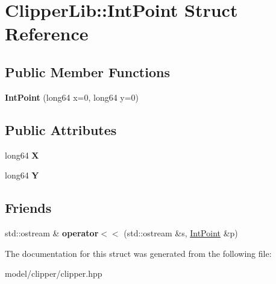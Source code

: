 \hypertarget{structClipperLib_1_1IntPoint}{\section{Clipper\-Lib\-:\-:Int\-Point Struct Reference}
\label{structClipperLib_1_1IntPoint}
}
\subsection*{Public Member Functions}
\begin{DoxyCompactItemize}
\item 
\hypertarget{structClipperLib_1_1IntPoint_a455b8d5c7f6d4c8e5adebcac8fa11e71}{{\bfseries Int\-Point} (long64 x=0, long64 y=0)}\label{structClipperLib_1_1IntPoint_a455b8d5c7f6d4c8e5adebcac8fa11e71}

\end{DoxyCompactItemize}
\subsection*{Public Attributes}
\begin{DoxyCompactItemize}
\item 
\hypertarget{structClipperLib_1_1IntPoint_af47546895f6b0403abf4701cb00bd6fa}{long64 {\bfseries X}}\label{structClipperLib_1_1IntPoint_af47546895f6b0403abf4701cb00bd6fa}

\item 
\hypertarget{structClipperLib_1_1IntPoint_a24a7d31ef4e1a5d8a70e7e29f5429011}{long64 {\bfseries Y}}\label{structClipperLib_1_1IntPoint_a24a7d31ef4e1a5d8a70e7e29f5429011}

\end{DoxyCompactItemize}
\subsection*{Friends}
\begin{DoxyCompactItemize}
\item 
\hypertarget{structClipperLib_1_1IntPoint_a9d7a086edc8217df9f23c9c1635e2fd9}{std\-::ostream \& {\bfseries operator$<$$<$} (std\-::ostream \&s, \hyperlink{structClipperLib_1_1IntPoint}{Int\-Point} \&p)}\label{structClipperLib_1_1IntPoint_a9d7a086edc8217df9f23c9c1635e2fd9}

\end{DoxyCompactItemize}


The documentation for this struct was generated from the following file\-:\begin{DoxyCompactItemize}
\item 
model/clipper/clipper.\-hpp\end{DoxyCompactItemize}
